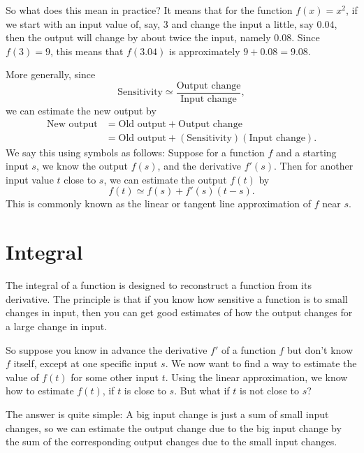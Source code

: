 \documentclass{math-deane}
\begin{document}
So what does this mean in practice? It means that for the function $f(x) = x^2$, if we start with an input value of, say, $3$ and change the input a little, say $0.04$, then the output will change by about twice the input, namely $0.08$. Since $f(3) = 9$, this means that $f(3.04)$ is approximately $9 + 0.08 = 9.08$.

More generally, since
\[
\text{Sensitivity} \simeq \frac{\text{Output change}}{\text{Input change}},
\]
we can estimate the new output by
\begin{align*}
\text{New output} &= \text{Old output} + \text{Output change}\\
&= \text{Old output} + (\text{Sensitivity})(\text{Input change}).
\end{align*}
We say this using symbols as follows: Suppose for a function $f$ and a starting input $s$, we know the output $f(s)$, and the derivative $f'(s)$. Then for another input value $t$ close to $s$, we can estimate the output $f(t)$ by
\[
f(t) \simeq f(s) + f'(s)(t-s).
\]
This is commonly known as the linear or tangent line approximation of $f$ near $s$.

\section{Integral}

The integral of a function is designed to reconstruct a function from its derivative. The principle is that if you know how sensitive a function is to small changes in input, then you can get good estimates of how the output changes for a large change in input.

So suppose you know in advance the derivative $f'$ of a function $f$ but don't know $f$ itself, except at one specific input $s$. We now want to find a way to estimate the value of $f(t)$ for some other input $t$. Using the linear approximation, we know how to estimate $f(t)$, if $t$ is close to $s$. But what if $t$ is not close to $s$?

The answer is quite simple: A big input change is just a sum of small input changes, so we can estimate the output change due to  the big input change by the sum of the corresponding output changes due to the small input changes.
\end{document}
